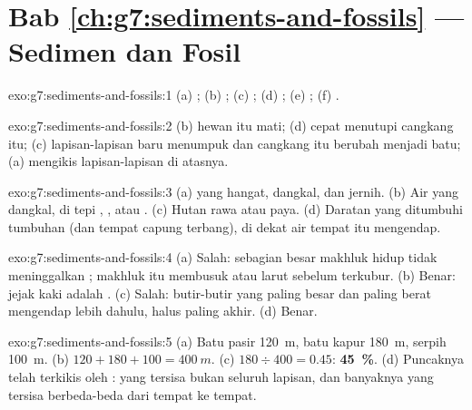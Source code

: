 \section*{Bab \ref{ch:g7:sediments-and-fossils} --- Sedimen dan Fosil}

\begin{solution}{exo:g7:sediments-and-fossils:1}
(a) ; (b) ; (c) ; (d) ; (e) ;
(f) .
\end{solution}

\begin{solution}{exo:g7:sediments-and-fossils:2}
(b) hewan itu mati; (d)  cepat menutupi cangkang itu; (c) lapisan-lapisan
baru menumpuk dan cangkang itu berubah menjadi batu; (a)  mengikis
lapisan-lapisan di atasnya.
\end{solution}

\begin{solution}{exo:g7:sediments-and-fossils:3}
(a)  yang hangat, dangkal, dan jernih. (b) Air yang dangkal, di tepi
, , atau . (c) Hutan rawa atau paya. (d) Daratan yang
ditumbuhi tumbuhan (dan tempat capung terbang), di dekat air tempat 
itu mengendap.
\end{solution}

\begin{solution}{exo:g7:sediments-and-fossils:4}
(a) Salah: sebagian besar makhluk hidup tidak meninggalkan ; makhluk
itu membusuk atau larut sebelum terkubur. (b) Benar: jejak kaki adalah
. (c) Salah: butir-butir yang paling besar dan paling berat
mengendap lebih dahulu,  halus paling akhir. (d) Benar.
\end{solution}

\begin{solution}{exo:g7:sediments-and-fossils:5}
(a) Batu pasir \qty{120}{m}, batu kapur \qty{180}{m}, serpih \qty{100}{m}.
(b) $120 + 180 + 100 = \qty{400}{m}$. (c) $180 \div 400 = 0.45$:
\textbf{45~\%}. (d) Puncaknya telah terkikis oleh : yang tersisa bukan
seluruh lapisan, dan banyaknya yang tersisa berbeda-beda dari tempat ke
tempat.
\end{solution}

